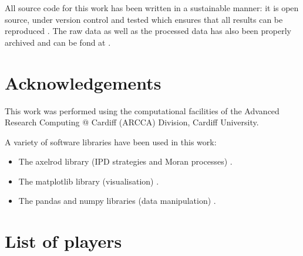 \documentclass{article}
\begin{document}
All source code for this work has been written in a sustainable manner: it is
open source, under version control and tested which ensures that all results can
be reproduced \cite{Prlic2012, Sandve2013, Wilson2014}. The raw data as well as
the processed data has also been properly archived and can be fond
at \cite{data}.


\section*{Acknowledgements}

This work was performed using the computational facilities of the Advanced
Research Computing @ Cardiff (ARCCA) Division, Cardiff University.

A variety of software libraries have been used in this work:

\begin{itemize}
    \item The axelrod library (IPD strategies and Moran processes)
        \cite{axelrodproject}.
    \item The matplotlib library (visualisation) \cite{hunter2007matplotlib}.
    \item The pandas and numpy libraries (data manipulation)
        \cite{mckinney2010data, walt2011numpy}.
\end{itemize}

\printbibliography

\appendix

\section{List of players}\label{app:list_of_players}

\begin{multicols}{3}
	\begin{enumerate}
		
	\end{enumerate}
\end{multicols}
\end{document}
